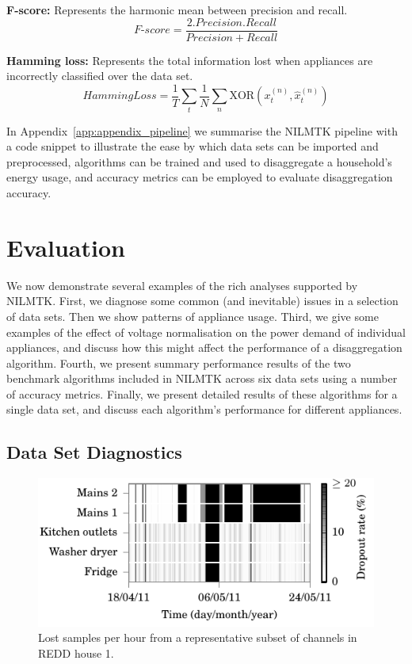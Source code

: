 \documentclass{sig-alternate}
\newcommand{\appref}[1]{Appendix~\ref{#1}}
\begin{document}
\textbf{F-score:} Represents the harmonic mean between precision and recall.
\begin{equation}
\mathit{F\text{-}score} = \frac
            {2 . \mathit{Precision} . \mathit{Recall}}
            {\mathit{Precision} + \mathit{Recall}}
\end{equation}

\textbf{Hamming loss:} Represents the total information lost when appliances are incorrectly classified over the data set.
\begin{equation}
\mathit{HammingLoss} = 
        \frac{1}{T} \sum_{t}
        \frac{1}{N} \sum_{n}
        \mathrm{XOR} \left ( x^{(n)}_t, \hat{x}^{(n)}_t \right )
\end{equation}



\noindent
In \appref{app:appendix_pipeline} we summarise the NILMTK pipeline with a code snippet to illustrate the ease by which data sets can be imported and preprocessed, algorithms can be trained and used to disaggregate a household's energy usage, and accuracy metrics can be employed to evaluate disaggregation accuracy.


\section{Evaluation}
\label{evaluation}

\noindent
We now demonstrate several examples of the rich analyses supported by NILMTK. First, we diagnose some common (and inevitable) issues in a selection of data sets.  Then we show patterns of appliance usage. Third, we give some examples of the effect of voltage normalisation on the power demand of individual appliances, and discuss how this might affect the performance of a disaggregation algorithm. Fourth, we present summary performance results of the two benchmark algorithms included in NILMTK across six data sets using a number of accuracy metrics. Finally, we present detailed results of these algorithms for a single data set, and discuss each algorithm's performance for different appliances.

\subsection{Data Set Diagnostics}

\begin{figure}[!t]
  \centering
  \includegraphics[width=\columnwidth]{figures/lost_samples.pdf} 
  \caption{Lost samples per hour from a representative subset of channels in REDD house 1.}
  \label{fig:lost_samples} 
\end{figure}
\end{document}

